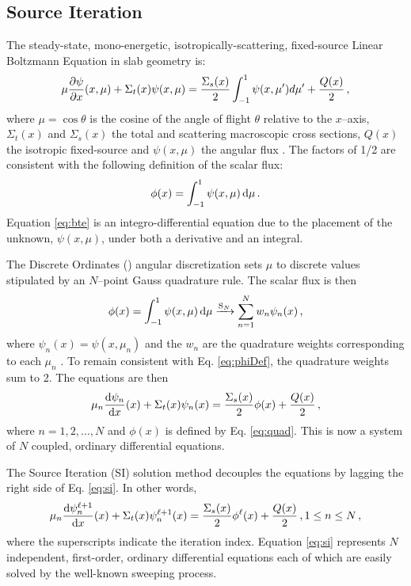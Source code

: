 
\subsection{Source Iteration}

	The steady-state, mono-energetic, isotropically-scattering, fixed-source Linear Boltzmann Equation in slab geometry is: 
		\begin{equation} \label{eq:bte}
			\mu \frac{\partial \psi}{\partial x}(x, \mu) + \Sigma_t(x) \psi(x,\mu) = 
			\frac{\Sigma_s(x)}{2} \int_{-1}^{1} \psi(x, \mu') d\mu' + \frac{Q(x)}{2} \,,
		\end{equation}
	where $\mu = \cos\theta$ is the cosine of the angle of flight $\theta$ relative to the $x$--axis, $\Sigma_t(x)$ and $\Sigma_s(x)$ the total and scattering macroscopic cross sections, $Q(x)$ the isotropic fixed-source and $\psi(x, \mu)$ the angular flux \cite{adams}. The factors of 1/2 are consistent with the following definition of the scalar flux:
		\begin{equation} \label{eq:phiDef}
			\phi(x) = \int_{-1}^1 \psi(x, \mu) \mathop{}\!\mathrm{d} \mu \,.
		\end{equation}
	Equation \ref{eq:bte} is an integro-differential equation due to the placement of the unknown, $\psi(x,\mu)$, under both a derivative and an integral.

	The Discrete Ordinates (\SN) angular discretization sets $\mu$ to discrete values stipulated by an $N$--point Gauss quadrature rule. The scalar flux is then 
		\begin{equation} \label{eq:quad}
			\phi(x) = \int_{-1}^1 \psi(x, \mu) \mathop{}\!\mathrm{d}\mu 
				\xrightarrow{\text{S}_N} \sum_{n=1}^N w_n \psi_n(x) \,,
		\end{equation}
	where $\psi_n(x) = \psi(x,\mu_n)$ and the $w_n$ are the quadrature weights corresponding to each $\mu_n$ \cite{llnl}. To remain consistent with Eq. \ref{eq:phiDef}, the quadrature weights sum to 2. The \SN equations are then 
		\begin{equation} \label{eq:sn}
			\mu_n \frac{\mathop{}\!\mathrm{d} \psi_n}{\mathop{}\!\mathrm{d} x}(x) + \Sigma_t(x) \psi_n(x) = 
			\frac{\Sigma_s(x)}{2} \phi(x) + \frac{Q(x)}{2} \,, 
		\end{equation}
	where $n = 1, 2, \dots, N$ and $\phi(x)$ is defined by Eq. \ref{eq:quad}. This is now a system of $N$ coupled, ordinary differential equations. 

	The Source Iteration (SI) solution method decouples the \SN equations by lagging the right side of Eq. \ref{eq:si}. In other words, 
		\begin{equation} \label{eq:si}
			\mu_n \frac{\mathop{}\!\mathrm{d} \psi_n^{\ell+1}}{\mathop{}\!\mathrm{d} x}(x) + \Sigma_t(x) \psi_n^{\ell+1}(x) = 
			\frac{\Sigma_s(x)}{2} \phi^{\ell}(x) + \frac{Q(x)}{2} \,, 1 \leq n \leq N \,,
		\end{equation}
	where the superscripts indicate the iteration index. 
	Equation \ref{eq:si} represents $N$ independent, first-order, ordinary differential equations each of which are easily solved by the well-known sweeping process. 

